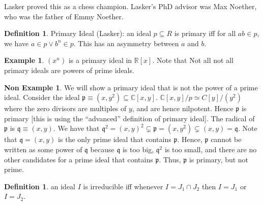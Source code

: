 \documentclass{book}
\newcommand{\C}{\ensuremath{\mathbb{C}}}
\newcommand{\R}{\ensuremath{\mathbb{R}}}
\newcommand{\p}{\mathfrak{p}}
\newcommand{\q}{\mathfrak{q}}
\theoremstyle{definition}
\newtheorem{example}[theorem]{Example}
\newtheorem{nonexample}[theorem]{Non Example}
\newtheorem{definition}[theorem]{Definition}
\begin{document}
Lasker proved this as a chess champion. Lasker's PhD advisor was Max Noether,
who was the father of Emmy Noether.

\begin{definition} Primary Ideal (Lasker): an ideal $p \subseteq R$ is primary
iff for all $ab \in p$, we have $a \in p \lor b^n \in p$. This has an
asymmetry between $a$ and $b$.
\end{definition}

\begin{example}
$(x^n)$ is a primary ideal in $\R[x]$. Note that
Not all not all primary ideals are powers of prime ideals.
\end{example}


\begin{nonexample}
We will show a primary ideal that is not the power of a prime ideal.
Consider the ideal $\p \equiv (x, y^2) \subseteq \C[x, y]$. 
$\C[x, y]/p \simeq C[y]/(y^2)$ where the zero divisors are multiples of $y$,
and are hence nilpotent. Hence $\p$ is primary [this is using the ``advanced''
definition of primary ideal]. The radical of $\p$ is $\q \equiv (x, y)$. We have
that $\q^2 = (x, y)^2 \subsetneq \p = (x, y^2) \subsetneq (x, y) = \q$. Note
that $\q=(x, y)$ is the only prime ideal that contains $\p$. Hence, $\p$
cannot be written as some power of $\q$ because $\q$ is too big, $\q^2$ is too
small, and there are no other candidates for a prime ideal that contains $\p$.
Thus, $\p$ is primary, but not prime.
\end{nonexample}


\begin{definition}
an ideal $I$ is irreducible iff whenever $I = J_1 \cap J_2$ then $I = J_1$
or $I = J_2$.
\end{definition}
\end{document}
